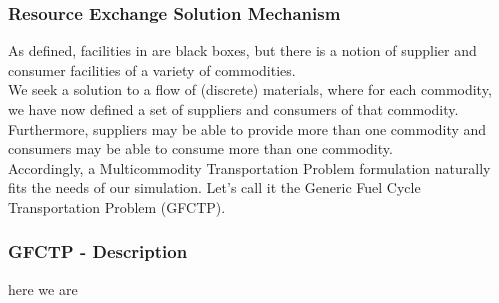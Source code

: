 \begin{frame}[ctb!]
  \frametitle{Resource Exchange Solution Mechanism}
  
  As defined, facilities in \Cyclus are black boxes, but there is a notion of
  supplier and consumer facilities of a variety of commodities.\\

  We seek a solution to a flow of (discrete) materials, where for each
  commodity, we have now defined a set of suppliers and consumers of that
  commodity.\\ 
  
  Furthermore, suppliers may be able to provide more than one commodity and
  consumers may be able to consume more than one commodity.\\

  Accordingly, a Multicommodity Transportation Problem formulation naturally
  fits the needs of our simulation. Let's call it the Generic Fuel Cycle
  Transportation Problem (GFCTP).
  
\end{frame}


\begin{frame}[ctb!]
  \frametitle{GFCTP - Description}

  here we are
  
\end{frame}
